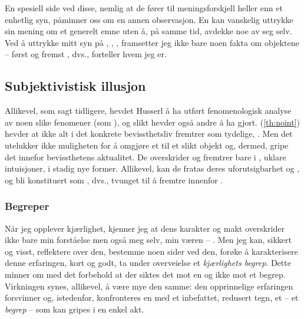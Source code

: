 En spesiell side ved disse, nemlig at de f{\o}rer til  
meningsforskjell heller enn et enhetlig syn, p{\aa}minner oss om en 
annen observasjon. En kan vanskelig uttrykke sin mening om et 
generelt emne uten {\aa}, p{\aa} samme tid, avdekke noe av seg selv. 
Ved {\aa} uttrykke mitt syn p{\aa} , 
, , framsetter 
jeg ikke bare noen fakta om objektene -- f{\o}rst og fremst 
, dvs., forteller hvem jeg 
er.%

\subsection{Subjektivistisk illusjon}

Allikevel, som sagt tidligere, hevdet Husserl {\aa} ha utf{\o}rt 
fenomenologisk analyse av noen slike fenomener (som 
), og slikt hevder ogs{\aa} andre {\aa} ha gjort. 
(\ref{th:noint}) hevder at ikke alt i det konkrete bevissthetsliv 
fremtrer som tydelige, . Men det utelukker 
ikke muligheten for {\aa} omgj{\o}re et  
til et slikt objekt og, dermed, gripe det innefor bevissthetens 
aktualitet. De  overskrider 
 og fremtrer bare i , uklare 
intuisjoner, i stadig nye former. Allikevel, kan de fratas deres 
uforutsigbarhet og , og bli konstituert som 
, dvs., tvunget til {\aa} fremtre innenfor 
. 

\subsubsection{Begreper}
N{\aa}r jeg opplever kj{\ae}rlighet, kjenner jeg at dens karakter og 
makt overskrider ikke bare min forst{\aa}else men ogs{\aa} meg selv, min 
v{\ae}ren -- . Men jeg kan, sikkert og 
visst, reflektere over den, bestemme noen sider ved den, for{\o}ke 
{\aa} karakterisere denne erfaringen, kort og godt, ta under 
overveielse et {\em kj{\ae}rlighets begrep}. Dette minner om 
 med det forbehold at der siktes det  mot en 
 og ikke mot et begrep. Virkningen synes, 
allikevel, {\aa} v{\ae}re mye den samme: den opprinnelige erfaringen 
forsvinner og, istedenfor, konfronteres en med et inbefattet, 
redusert tegn, et  -- et {\em begrep} -- som 
kan gripes i en enkel akt.

